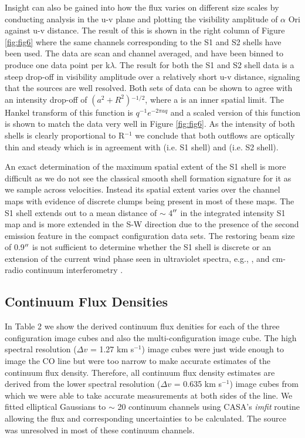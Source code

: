 \documentclass[iop]{emulateapj}
\begin{document}
Insight can also be gained into how the flux varies on different size scales by conducting analysis in the u-v plane and plotting the visibility amplitude of $\alpha$ Ori against u-v distance. The result of this is shown in the right column of Figure \ref{fig:fig6} where the same channels corresponding to the S1 and S2 shells have been used. The data are scan and channel averaged, and have been binned to produce one data point per k$\lambda$. The result for both the S1 and S2 shell data is a steep drop-off in visibility amplitude over a relatively short u-v distance, signaling that the sources are well resolved. Both sets of data can be shown to agree with an intensity drop-off of $(a^2 + R^2){}^{-1/2}$, where a is an inner spatial limit. The Hankel transform of this function is $q^{-1}e^{-2\pi aq}$  \citep{2000fta..book.....B} and a scaled version of this function is shown to match the data very well in Figure \ref{fig:fig6}. As the intensity of both shells is clearly proportional to R${}^{-1}$ we conclude that both outflows are  optically thin and steady which is in agreement with \cite{2009AJ....137.3558S} (i.e. S1 shell) and \cite{2002A&A...386.1009P} (i.e. S2 shell). 

An exact determination of the maximum spatial extent of the S1 shell is more difficult as we do not see the classical smooth shell formation signature for it as we sample across velocities. Instead its spatial extent varies over the channel maps with evidence of discrete clumps being present in most of these maps. The S1 shell extends out to a mean distance of $\sim$ 4$\mbox{$^{\prime\prime}$}$ in the integrated intensity S1 map and is more extended in the S-W direction due to the presence of the second emission feature in the compact configuration data sets. The restoring beam size of 0.9$\mbox{$^{\prime\prime}$}$ is not sufficient to determine whether the S1 shell is discrete or an extension of the current wind phase seen in ultraviolet spectra, e.g., \citep{1997ApJ...479..970C}, and cm-radio continuum interferometry \citep{1998Natur.392..575L, harper_2001}.

\subsection{Continuum Flux Densities} \label{results4} 

In Table 2 we show the derived continuum flux denities for each of the three configuration image cubes and also the multi-configuration image cube. The high spectral resolution ($\Delta v$ = 1.27 km s${}^{-1}$) image cubes were just wide enough to image the CO line but were too narrow to make accurate estimates of the continuum flux density. Therefore, all continuum flux density estimates are derived from the lower spectral resolution ($\Delta v$ = 0.635 km s${}^{-1}$) image cubes from which we were able to take accurate measurements at both sides of the line. We fitted elliptical Gaussians to $\sim$ 20 continuum channels using CASA's \textit{imfit} routine allowing the flux and corresponding uncertainties to be calculated. The source was unresolved in most of these continuum channels. 
\end{document}
